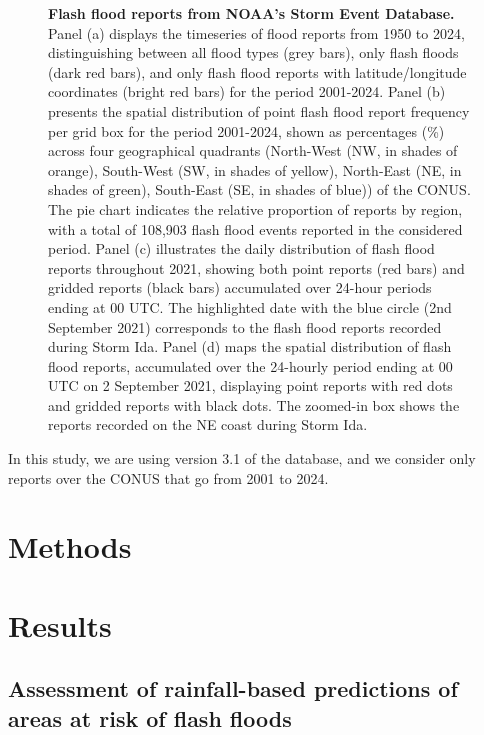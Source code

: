 \begin{figure}[htbp]
\caption{\textbf{Flash flood reports from NOAA's Storm Event Database.} Panel (a) displays the timeseries of flood reports from 1950 to 2024, distinguishing between all flood types (grey bars), only flash floods (dark red bars), and only flash flood reports with latitude/longitude coordinates (bright red bars) for the period 2001-2024. Panel (b) presents the spatial distribution of point flash flood report frequency per grid box for the period 2001-2024, shown as percentages (\%) across four geographical quadrants (North-West (NW, in shades of orange), South-West (SW, in shades of yellow), North-East (NE, in shades of green), South-East (SE, in shades of blue)) of the CONUS. The pie chart indicates the relative proportion of reports by region, with a total of 108,903 flash flood events reported in the considered period. Panel (c) illustrates the daily distribution of flash flood reports throughout 2021, showing both point reports (red bars) and gridded reports (black bars) accumulated over 24-hour periods ending at 00 UTC. The highlighted date with the blue circle (2nd September 2021) corresponds to the flash flood reports recorded during Storm Ida. Panel (d) maps the spatial distribution of flash flood reports, accumulated over the 24-hourly period ending at 00 UTC on 2 September 2021, displaying point reports with red dots and gridded reports with black dots. The zoomed-in box shows the reports recorded on the NE coast during Storm Ida.}
\label{fig:conus_domain}
\end{figure}

In this study, we are using version 3.1 of the database, and we consider only reports over the CONUS that go from 2001 to 2024. 


\section{Methods}
\label{flash_flood_focused_verification_rainfall_based_ff_METHODS}


\section{Results}
\label{flash_flood_focused_verification_rainfall_based_ff_RESULTS}

\subsection{Assessment of rainfall-based predictions of areas at risk of flash floods}
\label{verif_rainfall_based_fc}

